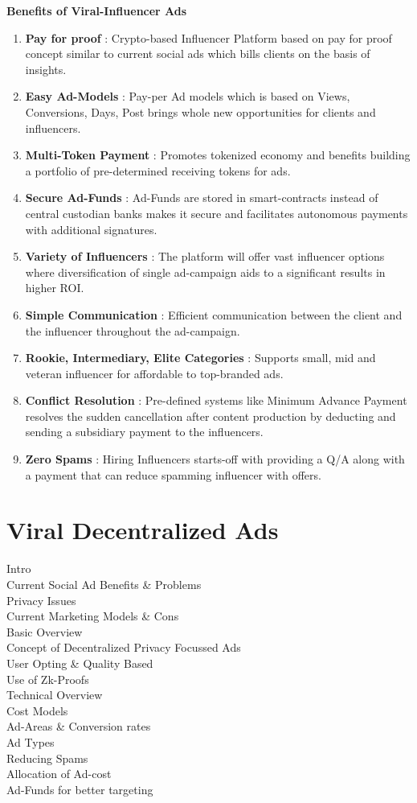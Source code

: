 \documentclass[conference]{IEEEtran}
\begin{document}
\textbf{Benefits of Viral-Influencer Ads}
\begin{enumerate}[wide, labelwidth=!, labelindent=0pt]
\item \textbf{Pay for proof} : Crypto-based Influencer Platform based on pay for proof concept similar to current social ads which bills clients on the basis of insights.
\item \textbf{Easy Ad-Models} : Pay-per Ad models which is based on Views, Conversions, Days, Post brings whole new opportunities for clients and influencers.
\item \textbf{Multi-Token Payment} : Promotes tokenized economy and benefits building a portfolio of pre-determined receiving tokens for ads.
\item \textbf{Secure Ad-Funds} : Ad-Funds are stored in smart-contracts instead of central custodian banks makes it secure and facilitates autonomous payments with additional signatures.
\item \textbf{Variety of Influencers} : The platform will offer vast influencer options where diversification of single ad-campaign aids to a significant results in higher ROI.
\item \textbf{Simple Communication} : Efficient communication between the client and the influencer throughout the ad-campaign.
\item \textbf{Rookie, Intermediary, Elite Categories} : Supports small, mid and veteran influencer for affordable to top-branded ads.
\item \textbf{Conflict Resolution} : Pre-defined systems like Minimum Advance Payment resolves the sudden cancellation after content production by deducting and sending a subsidiary payment to the influencers.
\item \textbf{Zero Spams} : Hiring Influencers starts-off with providing a Q/A along with a payment that can reduce spamming influencer with offers.
\end{enumerate}
\section{\textbf{Viral Decentralized Ads}}

Intro\\
Current Social Ad Benefits \& Problems\\
Privacy Issues\\
Current Marketing Models \& Cons\\
Basic Overview\\
Concept of Decentralized Privacy Focussed Ads\\
User Opting \& Quality Based\\
Use of Zk-Proofs\\
Technical Overview\\
Cost Models\\
Ad-Areas \& Conversion rates\\
Ad Types\\
Reducing Spams\\
Allocation of Ad-cost\\
Ad-Funds for better targeting\\
\end{document}
